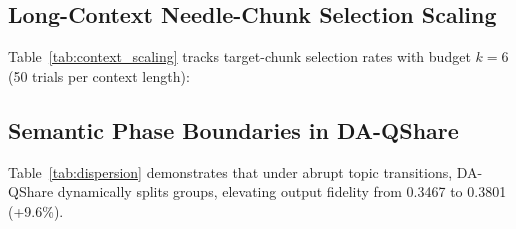 \documentclass[10pt,twocolumn]{article}
\begin{document}
\subsection{Long-Context Needle-Chunk Selection Scaling}
Table~\ref{tab:context_scaling} tracks target-chunk selection rates with budget $k=6$ (50 trials per context length):
\begin{table}[h]
\centering
\small
\caption{Synthetic target-chunk selection rate across context lengths ($k=6$, 50 trials per condition).}
\label{tab:context_scaling}
\end{table}

\subsection{Semantic Phase Boundaries in DA-QShare}
Table~\ref{tab:dispersion} demonstrates that under abrupt topic transitions, DA-QShare dynamically splits groups, elevating output fidelity from 0.3467 to 0.3801 (+9.6\%).
\begin{table}[h]
\centering
\small
\caption{Cosine similarity to dense attention in three synthetic query scenarios.}
\label{tab:dispersion}
\end{table}
\end{document}
